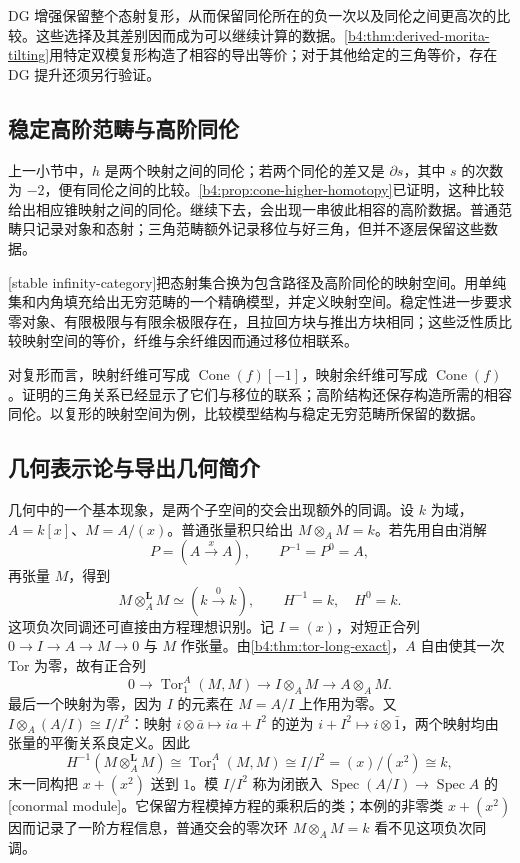 \ProseParagraphBreak
DG 增强保留整个态射复形，从而保留同伦所在的负一次以及同伦之间更高次的比较。这些选择及其差别因而成为可以继续计算的数据。\cref{b4:thm:derived-morita-tilting}用特定双模复形构造了相容的导出等价；对于其他给定的三角等价，存在 DG 提升还须另行验证。

\subsection{稳定高阶范畴与高阶同伦}
\label{b4:subsec:2004:02}

上一小节中，\(h\) 是两个映射之间的同伦；若两个同伦的差又是 \(\partial s\)，其中 \(s\) 的次数为 \(-2\)，便有同伦之间的比较。\cref{b4:prop:cone-higher-homotopy}已证明，这种比较给出相应锥映射之间的同伦。继续下去，会出现一串彼此相容的高阶数据。普通范畴只记录对象和态射；三角范畴额外记录移位与好三角，但并不逐层保留这些数据。

\ProseParagraphBreak
{}[stable infinity-category]把态射集合换为包含路径及高阶同伦的映射空间。用单纯集和内角填充给出无穷范畴的一个精确模型，并定义映射空间。稳定性进一步要求零对象、有限极限与有限余极限存在，且拉回方块与推出方块相同；这些泛性质比较映射空间的等价，纤维与余纤维因而通过移位相联系。

\ProseParagraphBreak
对复形而言，映射纤维可写成 \(\operatorname{Cone}(f)[-1]\)，映射余纤维可写成 \(\operatorname{Cone}(f)\)。证明的三角关系已经显示了它们与移位的联系；高阶结构还保存构造所需的相容同伦。以复形的映射空间为例，比较模型结构与稳定无穷范畴所保留的数据。

\subsection{几何表示论与导出几何简介}
\label{b4:subsec:2004:03}

几何中的一个基本现象，是两个子空间的交会出现额外的同调。设 \(k\) 为域，\(A=k[x]\)、\(M=A/(x)\)。普通张量积只给出 \(M\otimes_A M=k\)。若先用自由消解
\[
	P=(A\xrightarrow{x}A),\qquad P^{-1}=P^0=A,
\]
再张量 \(M\)，得到
\[
	M\otimes_A^{\mathbf L}M\simeq(k\xrightarrow{0}k), \qquad H^{-1}=k,\quad H^0=k.
\]
这项负次同调还可直接由方程理想识别。记 \(I=(x)\)，对短正合列 \(0\rightarrow I\rightarrow A\rightarrow M\rightarrow0\) 与 \(M\) 作张量。由\cref{b4:thm:tor-long-exact}，\(A\) 自由使其一次 Tor 为零，故有正合列
\[
	0\longrightarrow\operatorname{Tor}_1^A(M,M) \longrightarrow I\otimes_A M\longrightarrow A\otimes_A M.
\]
最后一个映射为零，因为 \(I\) 的元素在 \(M=A/I\) 上作用为零。又 \(I\otimes_A(A/I)\cong I/I^2\)：映射 \(i\otimes\bar a\longmapsto ia+I^2\) 的逆为 \(i+I^2\longmapsto i\otimes\bar1\)，两个映射均由张量的平衡关系良定义。因此
\[
	H^{-1}(M\otimes_A^{\mathbf L}M) \cong\operatorname{Tor}_1^A(M,M) \cong I/I^2=(x)/(x^2)\cong k,
\]
末一同构把 \(x+(x^2)\) 送到 \(1\)。模 \(I/I^2\) 称为闭嵌入 \(\operatorname{Spec}(A/I)\rightarrow\operatorname{Spec}A\) 的[conormal module]。它保留方程模掉方程的乘积后的类；本例的非零类 \(x+(x^2)\) 因而记录了一阶方程信息，普通交会的零次环 \(M\otimes_A M=k\) 看不见这项负次同调。

